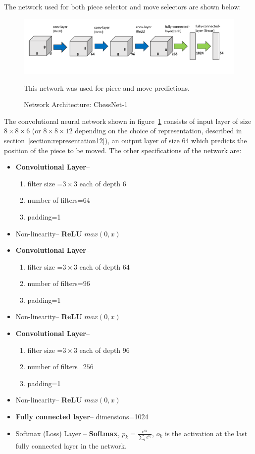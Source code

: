 The network used for both piece selector and move selectors are shown below:\\
\begin{figure}[H]
\includegraphics[width=1.0\textwidth,center]{img/net1.png}
\caption{Network Architecture: ChessNet-1}
\small\centering
This network was used for piece and move predictions.
\label{figure:network1}
\end{figure}
The convolutional neural network shown in figure~\ref{figure:network1} consists 
of input layer of size $8\times 8\times 6$ (or $8\times 8\times 12$ depending 
on the choice of representation, described in 
section~\ref{section:representation12}), an output layer of size 64 which 
predicts the position of the piece to be moved. The other specifications of the 
network are:
\begin{itemize}
 \item \textbf{Convolutional Layer}-- 
 \begin{enumerate}
  \item filter size =$3\times 3$ each of depth 6
  \item number of filters=$64$
  \item padding=1
 \end{enumerate}
 \item Non-linearity-- \textbf{ReLU} $max(0,x)$
 \item \textbf{Convolutional Layer}-- 
 \begin{enumerate}
  \item filter size =$3\times 3$ each of depth 64
  \item number of filters=$96$
  \item padding=1
 \end{enumerate}
 \item Non-linearity-- \textbf{ReLU} $max(0,x)$
 \item \textbf{Convolutional Layer}-- 
 \begin{enumerate}
  \item filter size =$3\times 3$ each of depth 96
  \item number of filters=$256$
  \item padding=1
 \end{enumerate}
 \item Non-linearity-- \textbf{ReLU} $max(0,x)$
 \item \textbf{Fully connected layer}-- dimensions=1024
 \item Softmax (Loss) Layer -- \textbf{Softmax}, 
 $p_k=\frac{e^{o_k}}{\sum_i e^{o_i}}$, $o_k$ is the activation at the last 
fully connected layer in the network.
\end{itemize}

